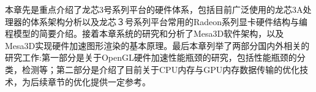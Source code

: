 
本章先是重点介绍了龙芯3号系列平台的硬件体系，包括目前广泛使用的龙芯3A处理器的体系架构分析以及龙芯３号系列平台常用的Radeon系列显卡硬件结构与编程模型的简要介绍。接着本章系统的研究和分析了Mesa3D软件架构，以及Mesa3D实现硬件加速图形渲染的基本原理。最后本章列举了两部分国内外相关的研究工作:第一部分是关于OpenGL硬件加速性能瓶颈的研究，包括性能瓶颈的分类，检测等；第二部分是介绍了目前关于CPU内存与GPU内存数据传输的优化技术，为后续章节的优化提供一定参考。
